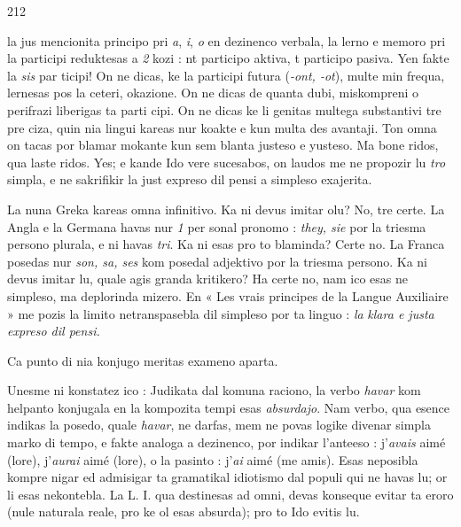 \begin{VUpage}[216]{212}
\VUasterismo{107.61mm}

\VUcontinue
la jus mencionita principo pri \textit{a}, \textit{i}, \textit{o} en dezinenco verbala,\nl
la lerno e memoro pri la participi reduktesas a \textit{2} kozi :\nl
nt participo aktiva, t participo pasiva. Yen fakte la \textit{sis} par\cc
ticipi! On ne dicas, ke la participi futura (\textit{-ont, -ot}), multe\nl
min frequa, lernesas pos la ceteri, okazione. On ne dicas\nl
de quanta dubi, miskompreni o perifrazi liberigas ta parti\cc
cipi. On ne dicas ke li genitas multega substantivi tre pre\cc
ciza, quin nia lingui kareas nur koakte e kun multa des\cc
avantaji. Ton omna on tacas por blamar mokante kun sem\cc
blanta justeso e yusteso. Ma bone ridos, qua laste ridos.\nl
Yes; e kande Ido vere sucesabos, on laudos me ne propozir\nl
lu \textit{tro} simpla, e ne sakrifikir la just expreso dil pensi a\nl
simpleso exajerita.

La nuna Greka kareas omna infinitivo. Ka ni devus imitar\nl
olu? No, tre certe. La Angla e la Germana havas nur \textit{1} per\cc
sonal pronomo : \textit{they, sie} por la triesma persono plurala, e\nl
ni havas \textit{tri}. Ka ni esas pro to blaminda? Certe no. La Franca\nl
posedas nur \textit{son, sa, ses} kom posedal adjektivo por la triesma\nl
persono. Ka ni devus imitar lu, quale agis granda kritikero?\nl
Ha certe no, nam ico esas ne simpleso, ma deplorinda mizero.\nl
En « Les vrais principes de la Langue Auxiliaire » me pozis\nl
la limito netranspasebla dil simpleso por ta linguo : \textit{la}\nl
\textit{klara e justa expreso dil pensi.}

\VUsaut{10.63mm}
\VUsaut{3.02mm}

Ca punto di nia konjugo meritas exameno aparta.

Unesme ni konstatez ico : Judikata dal komuna raciono,\nl
la verbo \textit{havar} kom helpanto konjugala en la kompozita tempi\nl
esas \textit{absurdajo}. Nam verbo, qua esence indikas la posedo,\nl
quale \textit{havar}, ne darfas, mem ne povas logike divenar simpla\nl
marko di tempo, e fakte analoga a dezinenco, por indikar\nl
l'anteeso : j'\textit{avais} aimé (lore), j'\textit{aurai} aimé (lore), o \nl
la pasinto : j'\textit{ai} aimé (me amis). Esas neposibla kompre\cc
nigar ed admisigar ta gramatikal idiotismo dal populi qui\nl
ne havas lu; or li esas nekontebla. La L. I. qua destinesas\nl
ad omni, devas konseque evitar ta eroro (nule naturala reale,\nl
pro ke ol esas absurda); pro to Ido evitis lu.
\end{VUpage}

